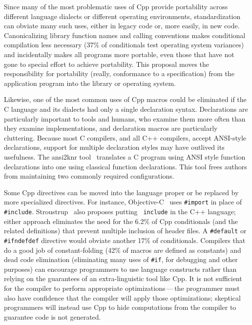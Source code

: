 \documentclass[10pt]{article}
\begin{document}
Since many of the most problematic uses of Cpp provide portability across
different language dialects or different operating environments,
standardization can obviate many such uses, either in legacy code or, more
easily, in new code.  Canonicalizing library
function names and calling conventions makes conditional compilation less
necessary (37\% of conditionals test operating system variances) and
incidentally makes all programs more portable, even those that have not
gone to special effort to achieve portability.  This proposal moves the
responsibility for portability (really, conformance to a specification)
from the application program into the library or operating system.

Likewise, one of the most common uses of Cpp macros could be eliminated if
the C language and its dialects had only a single declaration syntax.
Declarations are particularly important to tools and humans, who examine
them more often than they examine implementations, and declaration macros are
particularly cluttering.
Because most C compilers, and all C++ compilers, accept ANSI-style
declarations, support for multiple declaration styles may have outlived its
usefulness.  The ansi2knr tool~\cite{Deutsch90} translates a C program
using ANSI style function declarations into one using classical function
declarations.  This tool frees authors from maintaining two commonly
required configurations.

Some Cpp directives can be moved into the language proper or be replaced by
more specialized directives.  For instance, Objective-C~\cite{CoxN91} uses
{\tt \#import} in place of {\tt \#include}.
Stroustrup~\cite{Stroustrup-DesignEvolution} also proposes putting {\tt
include} in the C++ language; either approach eliminates the need for the
6.2\% of Cpp conditionals (and the related definitions) that prevent
multiple inclusion of header files.  A {\tt \#default} or {\tt \#ifndefdef}
directive would obviate another 17\% of conditionals.  Compilers that do a
good job of constant-folding (42\% of macros are defined as constants) and
dead code elimination (eliminating many uses of {\tt \#if}, for debugging
and other purposes) can encourage programmers to use language constructs
rather than relying on the guarantees of an extra-linguistic tool like Cpp.
It is not sufficient for the compiler to perform appropriate
optimizations\,---\,the programmer must also have confidence that the
compiler will apply those optimizations; skeptical programmers will instead
use Cpp to hide computations from the compiler to guarantee code is not
generated.
\end{document}
